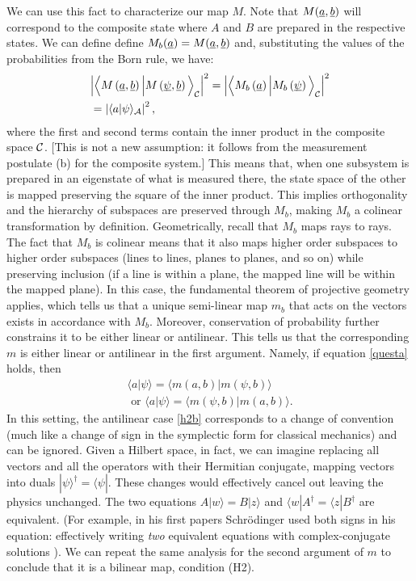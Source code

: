 \documentclass[aps,prl,amsmath,amssymb,twocolumn]{revtex4}
\theoremstyle{plain}
\theoremstyle{definition}
\theoremstyle{remark}
\newcommand{\pj}[1] {\underbar{$#1$}}
\def\>{\rangle}
\def\<{\langle}
\def\labell#1{\label{#1}}
\begin{document}
	We can use this fact to characterize our map $M$. Note that $M(\pj{a}, \pj{b})$ will correspond to the composite state where $A$ and $B$ are prepared in the respective states. We can define define $M_b(\pj{a}) = M(\pj{a},\pj{b})$ and, substituting the values of the
	probabilities from the Born rule, we have:
	\begin{align} &\Big|\Big\<M\left(\pj{a},\pj{b}\right)\Big|M\left(\pj{\psi},\pj{b}\right)\Big\>_{\cal C}\Big|^2
	=\Big|\Big\<M_b\left(\pj{a}\right)\Big|M_b\left(\pj{\psi}\right)\Big\>_{\cal C}\Big|^2
	\nonumber \\&
	=\left|\<a|\psi\>_{\cal A}\right|^2
	\labell{questa},
	\end{align}
	where the first and second terms contain the inner product in the composite
	space $\cal C$. [This is not a new assumption: it follows from the
	measurement postulate (b) for the composite system.] This means that,
	when one subsystem is prepared in an eigenstate of what is measured
	there, the state space of the other is mapped preserving the square of
	the inner product.
	This implies orthogonality and
	the hierarchy of subspaces are preserved through $M_b$, making $M_b$ a
	colinear transformation by definition. Geometrically, recall that $M_b$ maps rays to rays. The fact that $M_b$ is colinear means that it also maps higher order subspaces to higher order subspaces (lines to lines, planes to planes, and so on) while preserving inclusion (if a line is within a plane, the mapped line will be within the mapped plane). In this case, the fundamental
	theorem of projective geometry \cite{fun} applies, which tells us that
	a unique semi-linear map $m_b$ that acts on the vectors exists in accordance with $M_b$.
	Moreover, conservation of probability further constrains it to be
	either linear or antilinear. This tells us that the corresponding $m$
	is either linear or antilinear in the first argument. Namely, if equation
	\eqref{questa} holds, then
	\begin{align}
	\<a|\psi\>=\<m(a,b)|m(\psi,b)\>\labell{h2}\;
	\\\mbox{ or }
	\<a|\psi\>=\<m(\psi,b)|m(a,b)\> \labell{h2b}.
	\end{align}
	In this setting, the antilinear case \eqref{h2b} corresponds to a change of convention (much like a change of sign in the symplectic form for classical mechanics) and can be ignored. Given a Hilbert space, in fact, we can imagine replacing all vectors and all the operators with their Hermitian conjugate, mapping vectors into duals $|\psi\>^\dag=\<\psi|$. These changes would effectively cancel out leaving the physics unchanged. The two equations $A|w\>=B|z\>$ and $\<w|A^\dag=\<z|B^\dag$ are equivalent.  (For example, in his first papers
	Schr\"odinger used both signs in his equation: effectively writing
	{\em two} equivalent equations with complex-conjugate solutions
	\cite{sch}). We can repeat the same analysis for the second
	argument of $m$ to conclude that it is a bilinear map, condition (H2).
	
\end{document}
